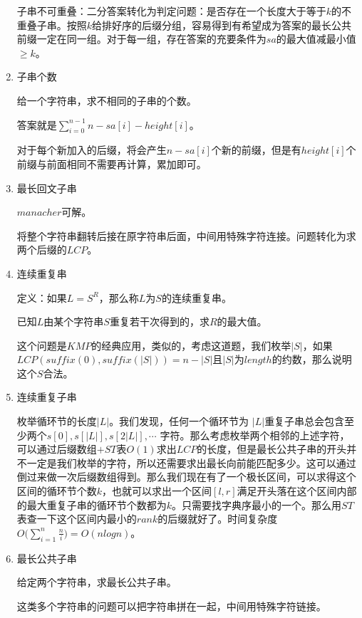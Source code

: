 \documentclass[11pt]{article}
\begin{document}
\begin{enumerate}
子串不可重叠：二分答案转化为判定问题：是否存在一个长度大于等于\(k\)的不重叠子串。按照\(k\)给排好序的后缀分组，容易得到有希望成为答案的最长公共前缀一定在同一组。对于每一组，存在答案的充要条件为\(sa\)的最大值减最小值\(\geq k\)。

\item 子串个数
\label{sec:org0831bdb}

给一个字符串，求不相同的子串的个数。

答案就是\(\sum_ {i = 0} ^ {n - 1} n - sa[i] - height[i]\)。

对于每个新加入的后缀，将会产生\(n-sa[i]\)个新的前缀，但是有\(height[i]\)个前缀与前面相同不需要再计算，累加即可。

\item 最长回文子串
\label{sec:org37972ba}

\(manacher\)可解。

将整个字符串翻转后接在原字符串后面，中间用特殊字符连接。问题转化为求两个后缀的\(LCP\)。

\item 连续重复串
\label{sec:orgbdf0f6c}

定义：如果\(L=S^R\)，那么称\(L\)为\(S\)的连续重复串。

已知\(L\)由某个字符串\(S\)重复若干次得到的，求\(R\)的最大值。

这个问题是\(KMP\)的经典应用，类似的，考虑这道题，我们枚举\(|S|\)，如果\(LCP(suffix(0),suffix(|S|))=n-|S|\)且\(|S|\)为\(length\)的约数，那么说明这个\(S\)合法。

\item 连续重复子串
\label{sec:org91d7559}

枚举循环节的长度\(|L|\)。我们发现，任何一个循环节为 \(|L|\)重复子串总会包含至少两个\(s[0],s[|L|],s[2|L|], \cdots\) 字符。那么考虑枚举两个相邻的上述字符，可以通过后缀数组\(+ST\)表\(O(1)\)求出\(LCP\)的长度，但是最长公共子串的开头并不一定是我们枚举的字符，所以还需要求出最长向前能匹配多少。这可以通过倒过来做一次后缀数组得到。那么我们现在有了一个极长区间，可以求得这个区间的循环节个数\(k\)，也就可以求出一个区间\([l,r]\)满足开头落在这个区间内部的最大重复子串的循环节个数都为\(k\)。只需要找字典序最小的一个。那么用\(ST\)表查一下这个区间内最小的\(rank\)的后缀就好了。时间复杂度\(O\Big(\sum_{i=1}^{n}\frac{n}{i}\Big)=O(nlogn)\)。

\item 最长公共子串
\label{sec:orgba43022}

给定两个字符串，求最长公共子串。

这类多个字符串的问题可以把字符串拼在一起，中间用特殊字符链接。


\end{enumerate}
\end{document}
